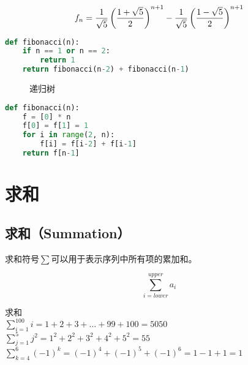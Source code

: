 $$
	f_n = {1 \over \sqrt{5}} \left({1 + \sqrt{5} \over 2} \right)^{n+1} - {1 \over \sqrt{5}} \left({1 - \sqrt{5} \over 2} \right)^{n+1}
$$

\begin{lstlisting}[language=Python, title=斐波那契数列（递归）]
def fibonacci(n):
    if n == 1 or n == 2:
        return 1
    return fibonacci(n-2) + fibonacci(n-1)
\end{lstlisting}

\begin{figure}[H]
	\centering
	\caption{递归树}
\end{figure}

\begin{lstlisting}[language=Python, title=斐波那契数列（迭代）]
def fibonacci(n):
    f = [0] * n
    f[0] = f[1] = 1
    for i in range(2, n):
        f[i] = f[i-2] + f[i-1]
    return f[n-1]
\end{lstlisting}

\newpage

\section{求和}

\subsection{求和（Summation）}

求和符号$ \sum $可以用于表示序列中所有项的累加和。

$$
	\sum_{i=lower}^{upper} a_i
$$

\begin{tcolorbox}
	求和\\
	$ \sum_{i=1}^{100} i = 1 + 2 +3 + \dots + 99 + 100 = 5050 $\\
	$ \sum_{j=1}^{5} j^2 = 1^2 + 2^2 + 3^2 + 4^2 + 5^2 = 55 $\\
	$ \sum_{k=4}^{6} (-1)^k = (-1)^4 + (-1)^5 + (-1)^6 = 1 - 1 + 1 = 1 $
\end{tcolorbox}

